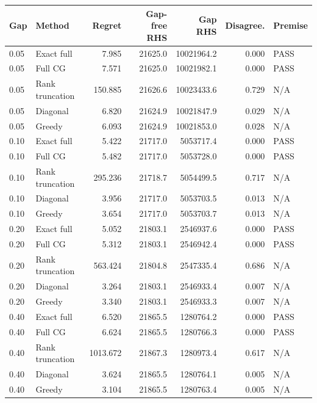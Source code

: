 \begin{tabular}{llrrrrl}
\toprule
Gap & Method & Regret & Gap-free RHS & Gap RHS & Disagree. & Premise \\
\midrule
0.05 & Exact full & 7.985 & 21625.0 & 10021964.2 & 0.000 & PASS \\
0.05 & Full CG & 7.571 & 21625.0 & 10021982.1 & 0.000 & PASS \\
0.05 & Rank truncation & 150.885 & 21626.6 & 10023433.6 & 0.729 & N/A \\
0.05 & Diagonal & 6.820 & 21624.9 & 10021847.9 & 0.029 & N/A \\
0.05 & Greedy & 6.093 & 21624.9 & 10021853.0 & 0.028 & N/A \\
0.10 & Exact full & 5.422 & 21717.0 & 5053717.4 & 0.000 & PASS \\
0.10 & Full CG & 5.482 & 21717.0 & 5053728.0 & 0.000 & PASS \\
0.10 & Rank truncation & 295.236 & 21718.7 & 5054499.5 & 0.717 & N/A \\
0.10 & Diagonal & 3.956 & 21717.0 & 5053703.5 & 0.013 & N/A \\
0.10 & Greedy & 3.654 & 21717.0 & 5053703.7 & 0.013 & N/A \\
0.20 & Exact full & 5.052 & 21803.1 & 2546937.6 & 0.000 & PASS \\
0.20 & Full CG & 5.312 & 21803.1 & 2546942.4 & 0.000 & PASS \\
0.20 & Rank truncation & 563.424 & 21804.8 & 2547335.4 & 0.686 & N/A \\
0.20 & Diagonal & 3.264 & 21803.1 & 2546933.4 & 0.007 & N/A \\
0.20 & Greedy & 3.340 & 21803.1 & 2546933.3 & 0.007 & N/A \\
0.40 & Exact full & 6.520 & 21865.5 & 1280764.2 & 0.000 & PASS \\
0.40 & Full CG & 6.624 & 21865.5 & 1280766.3 & 0.000 & PASS \\
0.40 & Rank truncation & 1013.672 & 21867.3 & 1280973.4 & 0.617 & N/A \\
0.40 & Diagonal & 3.624 & 21865.5 & 1280764.1 & 0.005 & N/A \\
0.40 & Greedy & 3.104 & 21865.5 & 1280763.4 & 0.005 & N/A \\
\bottomrule
\end{tabular}
